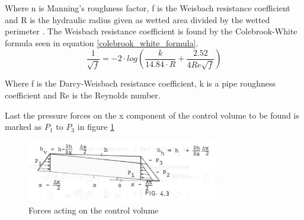 Where n is Manning's roughness factor, f is the Weisbach resistance coefficient and R is the hydraulic radius given as wetted area divided by the wetted perimeter \cite{stormwatercollectionsystems}.
The Weisbach resistance coefficient is found by the Colebrook-White formula seen in equation \ref{colebrook_white_formula}.
\begin{equation}
\frac{1}{\sqrt{f}} = -2\cdot log \left( \frac{k}{14.84 \cdot R}+ \frac{2.52}{4 Re \sqrt{f}} \right)
\label{colebrook_white_formula}
\end{equation}

Where f is the Darcy-Weisbach resistance coefficient, k is a pipe roughness coefficient and Re is the Reynolds number.

Last the pressure forces on the x component of the control volume to be found is marked as $P_1$ to $P_3$ in figure \ref{fig:forces_on_CV} 

\begin{figure}[H]
\centering
\includegraphics[width=0.75\textwidth]{report/modeling/pictures/palle_fig.png}
\caption{Forces acting on the control volume }
\label{fig:forces_on_CV}
\end{figure}

